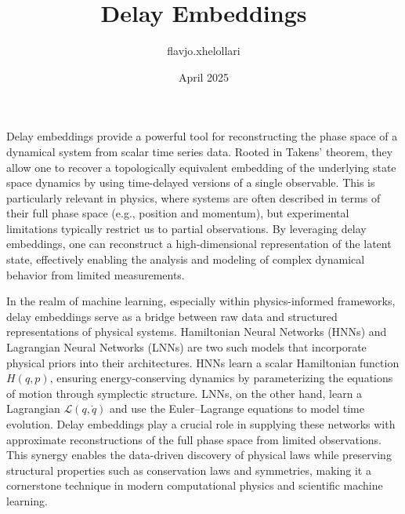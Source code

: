 \documentclass{article}
\title{Delay Embeddings}
\author{flavjo.xhelollari }
\date{April 2025}
\begin{document}
\maketitle

Delay embeddings provide a powerful tool for reconstructing the phase space of a dynamical system from scalar time series data. Rooted in Takens' theorem, they allow one to recover a topologically equivalent embedding of the underlying state space dynamics by using time-delayed versions of a single observable. This is particularly relevant in physics, where systems are often described in terms of their full phase space (e.g., position and momentum), but experimental limitations typically restrict us to partial observations. By leveraging delay embeddings, one can reconstruct a high-dimensional representation of the latent state, effectively enabling the analysis and modeling of complex dynamical behavior from limited measurements.

In the realm of machine learning, especially within physics-informed frameworks, delay embeddings serve as a bridge between raw data and structured representations of physical systems. Hamiltonian Neural Networks (HNNs) and Lagrangian Neural Networks (LNNs) are two such models that incorporate physical priors into their architectures. HNNs learn a scalar Hamiltonian function \( H(q, p) \), ensuring energy-conserving dynamics by parameterizing the equations of motion through symplectic structure. LNNs, on the other hand, learn a Lagrangian \( \mathcal{L}(q, \dot{q}) \) and use the Euler–Lagrange equations to model time evolution. Delay embeddings play a crucial role in supplying these networks with approximate reconstructions of the full phase space from limited observations. This synergy enables the data-driven discovery of physical laws while preserving structural properties such as conservation laws and symmetries, making it a cornerstone technique in modern computational physics and scientific machine learning.
\end{document}
